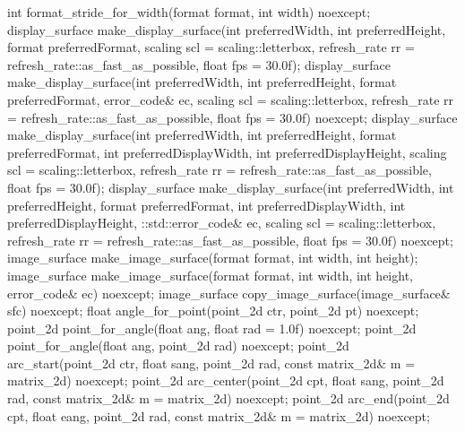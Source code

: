 \begin{codeblock}
{{{{  int format_stride_for_width(format format, int width) noexcept;
  display_surface make_display_surface(int preferredWidth,
    int preferredHeight, format preferredFormat,
    scaling scl = scaling::letterbox,
    refresh_rate rr = refresh_rate::as_fast_as_possible, float fps = 30.0f);
  display_surface make_display_surface(int preferredWidth,
    int preferredHeight, format preferredFormat, error_code& ec,
    scaling scl = scaling::letterbox,
    refresh_rate rr = refresh_rate::as_fast_as_possible, float fps = 30.0f) noexcept;
  display_surface make_display_surface(int preferredWidth,
    int preferredHeight, format preferredFormat, int preferredDisplayWidth, 
    int preferredDisplayHeight, scaling scl = scaling::letterbox,
    refresh_rate rr = refresh_rate::as_fast_as_possible, float fps = 30.0f);
  display_surface make_display_surface(int preferredWidth,
    int preferredHeight, format preferredFormat, int preferredDisplayWidth, 
    int preferredDisplayHeight, ::std::error_code& ec,
    scaling scl = scaling::letterbox,
    refresh_rate rr = refresh_rate::as_fast_as_possible, float fps = 30.0f) noexcept;
  image_surface make_image_surface(format format, int width, int height);
  image_surface make_image_surface(format format, int width, int height, 
    error_code& ec) noexcept;
  image_surface copy_image_surface(image_surface& sfc) noexcept;
  float angle_for_point(point_2d ctr, point_2d pt) noexcept;
  point_2d point_for_angle(float ang, float rad = 1.0f) noexcept;
  point_2d point_for_angle(float ang, point_2d rad) noexcept;
  point_2d arc_start(point_2d ctr, float sang, point_2d rad, 
    const matrix_2d& m = matrix_2d{}) noexcept;
  point_2d arc_center(point_2d cpt, float sang, point_2d rad, 
    const matrix_2d& m = matrix_2d{}) noexcept;
  point_2d arc_end(point_2d cpt, float eang, point_2d rad, 
    const matrix_2d& m = matrix_2d{}) noexcept;
} } } }

\end{codeblock}
%
